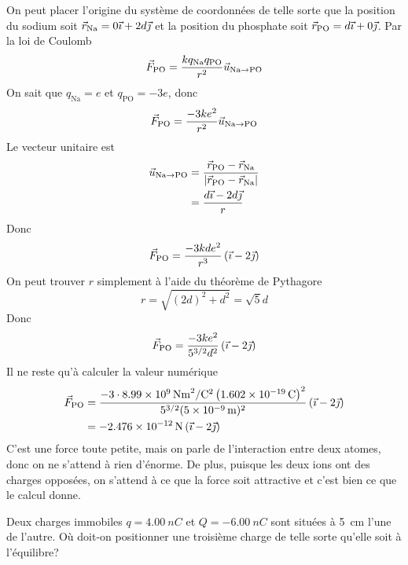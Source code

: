 \begin{reponsebox}
  On peut placer l'origine du système de coordonnées de telle sorte que la
  position du sodium soit $\vec{r}_\mathrm{Na} = 0\vec{\imath} + 2d\vec{\jmath}$ et la position du
  phosphate soit $\vec{r}_\mathrm{PO} = d\vec{\imath} + 0\vec{\jmath}$. Par la loi de Coulomb
  \[
    \vec{F}_\mathrm{PO} =
      \frac{kq_\mathrm{Na}q_\mathrm{PO}}{r^2}
      \vec{u}_{\mathrm{Na}\rightarrow \mathrm{PO}}
  \]
  On sait que $q_\mathrm{Na} = e$ et $q_\mathrm{PO} = -3e$, donc
  \[
    \vec{F}_\mathrm{PO} = \frac{-3ke^2}{r^2}
      \vec{u}_{\mathrm{Na}\rightarrow \mathrm{PO}}
  \]
  Le vecteur unitaire est
  \begin{align*}
    \vec{u}_{\mathrm{Na}\rightarrow \mathrm{PO}} &=
      \frac{\vec{r}_\mathrm{PO} - \vec{r}_\mathrm{Na}}
           {\left| \vec{r}_\mathrm{PO} - \vec{r}_\mathrm{Na} \right|}  \\
    &= \frac{d\vec{\imath} - 2d\vec{\jmath}}{r}
  \end{align*}
  Donc
  \begin{align*}
    \vec{F}_\mathrm{PO} = \frac{-3kde^2}{r^3}\left(\vec{\imath} - 2\vec{\jmath}\right)
  \end{align*}
  On peut trouver $r$ simplement à l'aide du théorème de Pythagore
  \[
    r = \sqrt{(2d)^2 + d^2} = \sqrt{5}d
  \]
  Donc
  \begin{align*}
    \vec{F}_\mathrm{PO} = \frac{-3ke^2}{5^{3/2} d^2}\left(\vec{\imath} - 2\vec{\jmath}\right)
  \end{align*}
  Il ne reste qu'à calculer la valeur numérique
  \begin{align*}
    \vec{F}_\mathrm{PO} &= \frac{-3 \cdot \SI{8.99e9}{Nm^2\per C^2}
                            \left(\SI{1.602e-19}{C}\right)^2}
                           {5^{3/2} (\SI{5e-9}{m})^2}
                      \left(\vec{\imath} - 2\vec{\jmath}\right)  \\
                    &= \SI{-2.476e-12}{N}
                      \left(\vec{\imath} - 2\vec{\jmath}\right)
  \end{align*}
  C'est une force toute petite, mais on parle de l'interaction entre deux
  atomes, donc on ne s'attend à rien d'énorme. De plus, puisque les deux ions
  ont des charges opposées, on s'attend à ce que la force soit attractive et
  c'est bien ce que le calcul donne.
\end{reponsebox}

\begin{diapobox}
  Deux charges immobiles $q = \SI{4.00}{nC}$ et $Q = \SI{-6.00}{nC}$ sont
  situées à \SI{5}{cm} l'une de l'autre.  Où doit-on positionner une troisième
  charge de telle sorte qu'elle soit à l'équilibre?
\end{diapobox}

